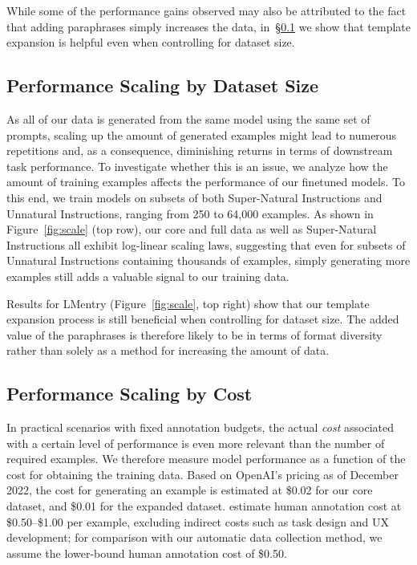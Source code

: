 While some of the performance gains observed may also be attributed to the fact that adding paraphrases simply increases the data, in~\S\ref{sec:scaling_data} we show that template expansion is helpful even when controlling for dataset size.

\subsection{Performance Scaling by Dataset Size}
\label{sec:scaling_data}

As all of our data is generated from the same model using the same set of prompts, scaling up the amount of generated examples might lead to numerous repetitions and, as a consequence, diminishing returns in terms of downstream task performance. To investigate whether this is an issue, we analyze how the amount of training examples affects the performance of our finetuned models. To this end, we train models on subsets of both Super-Natural Instructions and Unnatural Instructions, ranging from 250 to 64,000 examples. As shown in Figure~\ref{fig:scale} (top row), our core and full data as well as Super-Natural Instructions all exhibit log-linear scaling laws, suggesting that even for subsets of Unnatural Instructions containing thousands of examples, simply generating more examples still adds a valuable signal to our training data.

Results for LMentry (Figure~\ref{fig:scale}, top right) show that our template expansion process is still beneficial when controlling for dataset size. The added value of the paraphrases is therefore likely to be in terms of format diversity rather than solely as a method for increasing the amount of data.

\subsection{Performance Scaling by Cost}

In practical scenarios with fixed annotation budgets, the actual \emph{cost} associated with a certain level of performance is even more relevant than the number of required examples. We therefore measure model performance as a function of the cost for obtaining the training data. Based on OpenAI's pricing as of December 2022, the cost for generating an example is estimated at \$0.02 for our core dataset, and \$0.01 for the expanded dataset. \citet{kiela-etal-2021-dynabench} estimate human annotation cost at \$0.50--\$1.00 per example, excluding indirect costs such as task design and UX development; for comparison with our automatic data collection method, we assume the lower-bound human annotation cost of \$0.50.

